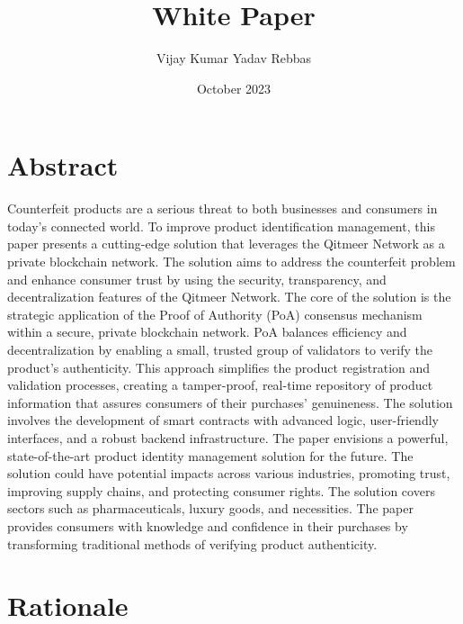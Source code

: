 \documentclass[12pt,a4letter]{article}
\title{White Paper}
\author{Vijay Kumar Yadav Rebbas }
\date{October 2023}
\begin{document}
\maketitle

\section*{Abstract}

Counterfeit products are a serious threat to both businesses and consumers in today’s connected world. To improve product identification management, this paper presents a cutting-edge solution that leverages the Qitmeer Network as a private blockchain network. The solution aims to address the counterfeit problem and enhance consumer trust by using the security, transparency, and decentralization features of the Qitmeer Network. The core of the solution is the strategic application of the Proof of Authority (PoA) consensus mechanism within a secure, private blockchain network. PoA balances efficiency and decentralization by enabling a small, trusted group of validators to verify the product’s authenticity. This approach simplifies the product registration and validation processes, creating a tamper-proof, real-time repository of product information that assures consumers of their purchases’ genuineness. The solution involves the development of smart contracts with advanced logic, user-friendly interfaces, and a robust backend infrastructure. The paper envisions a powerful, state-of-the-art product identity management solution for the future. The solution could have potential impacts across various industries, promoting trust, improving supply chains, and protecting consumer rights. The solution covers sectors such as pharmaceuticals, luxury goods, and necessities. The paper provides consumers with knowledge and confidence in their purchases by transforming traditional methods of verifying product authenticity.

\section*{Rationale}
\end{document}

